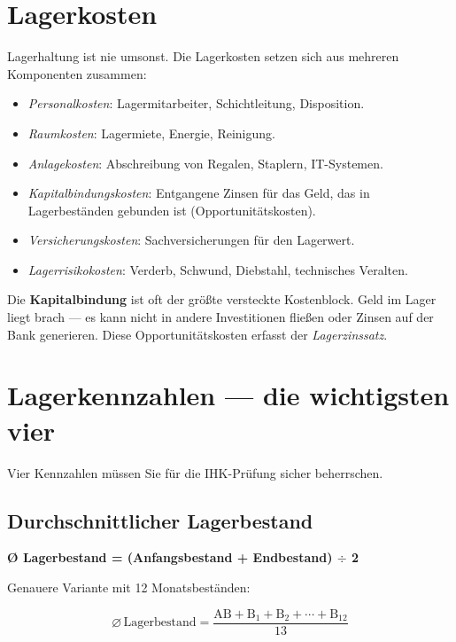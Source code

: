 \documentclass[11pt, a4paper]{article}
\begin{document}
\section{Lagerkosten}

Lagerhaltung ist nie umsonst. Die Lagerkosten setzen sich aus mehreren Komponenten
zusammen:

\begin{itemize}[itemsep=0pt]
  \item \emph{Personalkosten}: Lagermitarbeiter, Schichtleitung, Disposition.
  \item \emph{Raumkosten}: Lagermiete, Energie, Reinigung.
  \item \emph{Anlagekosten}: Abschreibung von Regalen, Staplern, IT-Systemen.
  \item \emph{Kapitalbindungskosten}: Entgangene Zinsen für das Geld, das in Lagerbeständen gebunden ist (Opportunitätskosten).
  \item \emph{Versicherungskosten}: Sachversicherungen für den Lagerwert.
  \item \emph{Lagerrisikokosten}: Verderb, Schwund, Diebstahl, technisches Veralten.
\end{itemize}

\begin{merksatz}
Die \textbf{Kapitalbindung} ist oft der größte versteckte Kostenblock. Geld im Lager
liegt brach --- es kann nicht in andere Investitionen fließen oder Zinsen auf der Bank
generieren. Diese Opportunitätskosten erfasst der \emph{Lagerzinssatz}.
\end{merksatz}

\section{Lagerkennzahlen --- die wichtigsten vier}

Vier Kennzahlen müssen Sie für die IHK-Prüfung sicher beherrschen.

\subsection{Durchschnittlicher Lagerbestand}

\begin{merksatz}[title={Formel}]
\textbf{Ø Lagerbestand = (Anfangsbestand + Endbestand) $\div$ 2}
\end{merksatz}

Genauere Variante mit 12 Monatsbeständen:

\[
\varnothing\,\text{Lagerbestand} = \frac{\text{AB} + \text{B}_1 + \text{B}_2 + \cdots + \text{B}_{12}}{13}
\]
\end{document}
